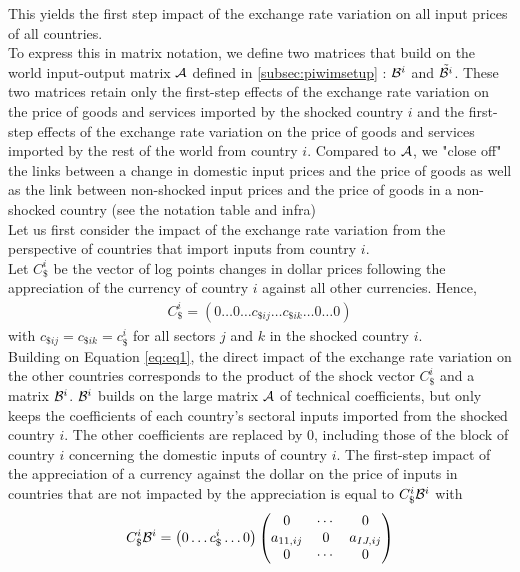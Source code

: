 \documentclass[11pt,a4paper]{paper} %
\begin{document}
This yields the first step impact of the exchange rate variation on all input prices of all countries.\\
To express this in matrix notation, we define two matrices that build on the world input-output matrix $\cal A$ defined in \ref{subsec:piwimsetup} : ${{\cal B}^i}$ and ${\tilde{{\cal B}^i}}$. 
These two matrices retain only the first-step effects of the exchange rate variation on the price of goods and services imported by the shocked country $i$ and the first-step effects of the exchange rate variation on the price of goods and services imported by the rest of the world from country $i$. 
Compared to $\cal A$, we "close off" the links between a change in domestic input prices and the price of goods as well as the link between non-shocked input prices and the price of goods in a non-shocked country (see the notation table and infra)\\
Let us first consider the impact of the exchange rate variation from the perspective of countries that import inputs from country $i$.\\
Let $C_\$^i$ be the vector of log points changes in dollar prices following the 
appreciation of the currency of country $i$ against all other currencies.
Hence,
\begin{eqnarray*}
C_\$^i=\left(0\ldots0\ldots c_{\$ij}\ldots c_{\$ik}\dots 0\ldots0\right)
\end{eqnarray*}
with $c_{\$ij}=c_{\$ik}=c_\$^i
$
for all sectors $j$ and $k$ in the shocked country $i$.\\
Building on Equation \ref{eq:eq1}, the direct impact of the exchange rate variation on the other countries corresponds to the product of the shock vector $C_\$^i$ and a matrix ${\cal B}^i$. 
${\cal B}^i$ builds on the large matrix ${\cal A}$ of technical coefficients, but only keeps the coefficients of each country's sectoral inputs imported from the shocked country $i$. The other coefficients are replaced by 0, including those of the block of country $i$ concerning the domestic inputs of country $i$. 
The first-step impact of the appreciation of a currency against the dollar on the price of inputs in countries that are not impacted by the appreciation is equal to $C_\$^i{\cal B}^i$ with
\begin{eqnarray}
C_\$^i{\cal B}^i=\left(0\ldots c_\$^i \ldots 0\right)\left(\begin{matrix}0&\cdots&0\\a_{11,ij}&0&a_{IJ,ij}\\0&\cdots&0\\\end{matrix}\right) 	
\label{eq:eq3}
\end{eqnarray}
\end{document}
